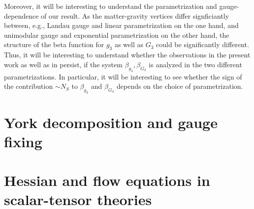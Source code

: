 \documentclass[11pt]{book} %
\numberwithin{equation}{chapter}
\begin{document}
{Moreover, it will be interesting to understand the parametrization and gauge-dependence of our result.
As the matter-gravity vertices differ signficiantly between,
e.g., Landau gauge and linear parametrization on the one hand,
and unimodular gauge and exponential parametrization on the other hand,
the structure of the beta function for $g_3$ as well as $G_3$ could be significantly different.
Thus, it will be interesting to understand whether the observations in the present work as
well as in \cite{Meibohm:2015twa} persist,
if the system $\beta_{g_3}, \beta_{G_3}$ is analyzed in the two different parametrizations.
In particular, it will be interesting to see whether the sign of the contribution
$\sim N_S$ to $\beta_{g_3}$ and $\beta_{G_3}$ depends on the choice of parametrization.




\nocite{*}






\appendix
\begin{appendices}
\chapter{York decomposition and gauge fixing}
\label{app:York}

\chapter{Hessian and flow equations in scalar-tensor theories}
\label{app:Hessian}


\end{appendices}}
\end{document}
